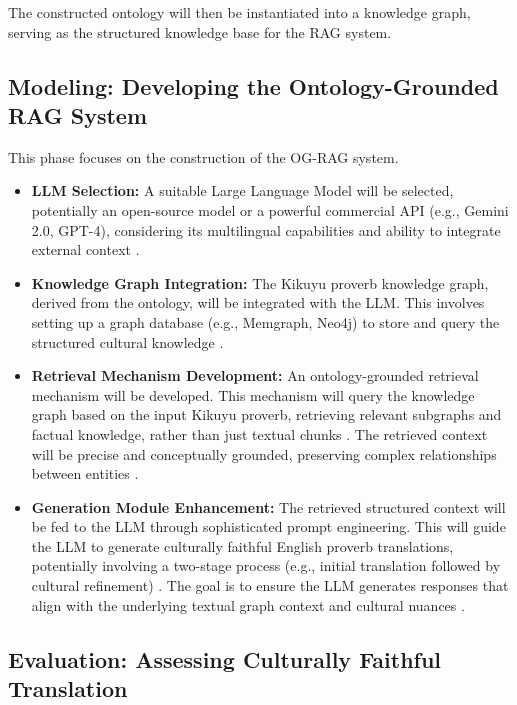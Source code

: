 \documentclass[12pt]{article}
\let\cite\textcite  %
\begin{document}
The constructed ontology will then be instantiated into a knowledge graph, serving as the structured knowledge base for the RAG system.

\subsection{Modeling: Developing the Ontology-Grounded RAG System}

This phase focuses on the construction of the OG-RAG system.

\begin{itemize}
\item \textbf{LLM Selection:} A suitable Large Language Model will be selected, potentially an open-source model or a powerful commercial API (e.g., Gemini 2.0, GPT-4), considering its multilingual capabilities and ability to integrate external context \cite{li2024rag}.

\item \textbf{Knowledge Graph Integration:} The Kikuyu proverb knowledge graph, derived from the ontology, will be integrated with the LLM. This involves setting up a graph database (e.g., Memgraph, Neo4j) to store and query the structured cultural knowledge \cite{chen2024integrating, smith2023prompt}.

\item \textbf{Retrieval Mechanism Development:} An ontology-grounded retrieval mechanism will be developed. This mechanism will query the knowledge graph based on the input Kikuyu proverb, retrieving relevant subgraphs and factual knowledge, rather than just textual chunks \cite{chen2024og, chen2024integrating}. The retrieved context will be precise and conceptually grounded, preserving complex relationships between entities \cite{chen2024og, chen2024integrating}.

\item \textbf{Generation Module Enhancement:} The retrieved structured context will be fed to the LLM through sophisticated prompt engineering. This will guide the LLM to generate culturally faithful English proverb translations, potentially involving a two-stage process (e.g., initial translation followed by cultural refinement) \cite{li2024rag}. The goal is to ensure the LLM generates responses that align with the underlying textual graph context and cultural nuances \cite{datacamp2024kg}.
\end{itemize}

\subsection{Evaluation: Assessing Culturally Faithful Translation}
\end{document}
